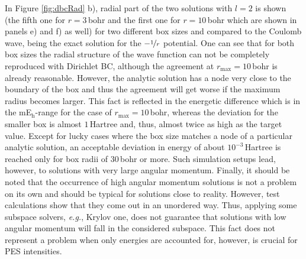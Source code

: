 In Figure \ref{fig:dbcRad} b), radial part of the two solutions with $l=2$ is shown (the fifth one for $r=3$\,bohr and the first one for $r=10$\,bohr which are shown in panels e) and f) as well) for two different box sizes and compared to the Coulomb wave, being the exact solution for the $-\nicefrac{1}{r}$ potential.
One can see that for both box sizes the radial structure of the wave function can not be completely reproduced with Dirichlet BC, although the agreement at $r_\text{max}=10\,$bohr is already reasonable.
However, the analytic solution has a node very close to the boundary of the box and thus the agreement will get worse if the maximum radius becomes larger.
This fact is reflected in the energetic difference which is in the mE$_\text{h}$-range for the case of $r_\text{max}=10$\,bohr, whereas the deviation for the smaller box is almost $1\,$Hartree and, thus, almost twice as high as the target value.
Except for lucky cases where the box size matches a node of a particular analytic solution, an acceptable deviation in energy of about $10^{-3}\,$Hartree is reached only for box radii of $30\,$bohr or more.
Such simulation setups lead, however, to solutions with very large angular momentum.
Finally, it should be noted that the occurrence of high angular momentum solutions is not a problem on its own and should be typical for solutions close to reality.
However, test calculations show that they come out in an unordered way.
Thus, applying some subspace solvers, \textit{e.g.}, Krylov one, does not guarantee that solutions with low angular momentum will fall in the considered subspace.
This fact does not represent a problem when only energies are accounted for, however, is crucial for PES intensities.


